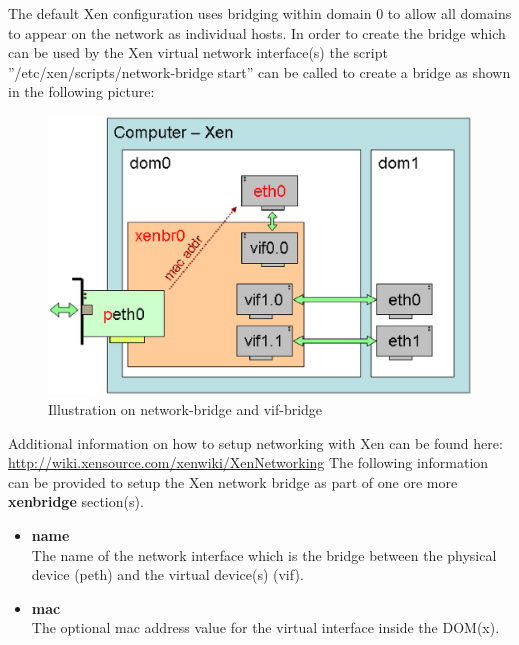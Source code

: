 The default Xen configuration uses bridging within domain 0 to allow all
domains to appear on the network as individual hosts. In order to create
the bridge which can be used by the Xen virtual network interface(s) the
script ''/etc/xen/scripts/network-bridge start'' can be called to create
a bridge as shown in the following picture:

\begin{figure}[h]
\centering
\includegraphics[scale=0.5]{pictures/xenbridge.eps}
\caption{Illustration on network-bridge and vif-bridge}
\label{fig:architecture}
\end{figure}

Additional information on how to setup networking with Xen can be
found here: \url{http://wiki.xensource.com/xenwiki/XenNetworking}
The following information can be provided to setup the Xen network
bridge as part of one ore more \textbf{xenbridge} section(s).

\begin{itemize}
\item \textbf{name}\\
      The name of the network interface which is the bridge between
      the physical device (peth) and the virtual device(s) (vif).
\item \textbf{mac}\\
      The optional mac address value for the virtual interface inside
      the DOM(x).
\end{itemize}


